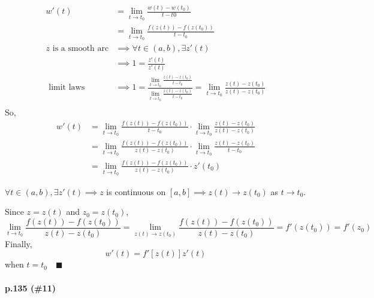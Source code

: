 \documentclass{article}
\begin{document}
\begin{align*} w'(t) &= \lim_{t\rightarrow t_0}\frac{w(t) -
                       w(t_0)}{t-t0}\\
                     &= \lim_{t\rightarrow t_0}\frac{f(z(t)) -
                       f(z(t_0))}{t-t_0}\\
  z\text{ is a smooth arc} &\implies\forall t\in (a,b), \exists
                             z'(t)\\
                     &\implies 1 = \frac{z'(t)}{z'(t)}\\
  \text{ limit laws }&\implies 1 = \frac{\lim_{t\rightarrow t_0}
                       \frac{z(t)-z(t_0)}{t-t_0}}{\lim_{t\rightarrow
                       t_0} \frac{z(t)-z(t_0)}{t-t_0}} = \lim_{t\rightarrow t_0}
                       \frac{z(t)-z(t_0)}{z(t)-z(t_0)}\\
\end{align*}
So,
\begin{align*}
  w'(t) &= \lim_{t\rightarrow t_0}\frac{f(z(t)) -
                       f(z(t_0))}{t-t_0}\cdot\lim_{t\rightarrow t_0}
                       \frac{z(t)-z(t_0)}{z(t)-z(t_0)} \\ &=\lim_{t\rightarrow t_0}\frac{f(z(t)) -
                       f(z(t_0))}{z(t)-z(t_0)}\cdot\lim_{t\rightarrow t_0}
                       \frac{z(t)-z(t_0)}{t-t_0}\\ &= \lim_{t\rightarrow t_0}\frac{f(z(t)) -
                                                     f(z(t_0))}{z(t)-z(t_0)}\cdot z'(t_0)
\end{align*}

$\forall t\in (a,b), \exists z'(t) \implies z$ is continuous on $[a,b]
\implies z(t)\rightarrow z(t_0)$ as $t\rightarrow t_0.$

Since $z = z(t)$ and $z_0 = z(t_0)$,
\[\lim_{t\rightarrow t_0}\frac{f(z(t)) -
                                                     f(z(t_0))}{z(t)-z(t_0)}
                                                   = \lim_{z(t)\rightarrow z(t_0)}\frac{f(z(t)) -
                                                     f(z(t_0))}{z(t)-z(t_0)}
                                                   = f'(z(t_0)) = f'(z_0)\]
                                                 Finally,\[ w'(t) =
                                                   f'[z(t)]z'(t)\]
                                                 when $t = t_0\quad \blacksquare$
\paragraph{p.135 \color{blue}(\#11)\color{black}}
\end{document}
